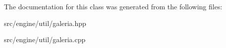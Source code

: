 The documentation for this class was generated from the following files\+:\begin{DoxyCompactItemize}
\item 
src/engine/util/galeria.\+hpp\item 
src/engine/util/galeria.\+cpp\end{DoxyCompactItemize}
